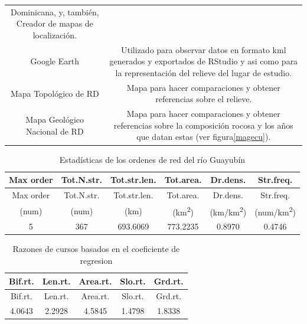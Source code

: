 \documentclass[11pt,]{article}
\begin{document}
\begin{longtable}[]{@{}cc@{}}
\begin{minipage}[t]{0.83\columnwidth}
Dominicana, y, también, Creador de mapas de localización.\strut
\end{minipage}\tabularnewline
\begin{minipage}[t]{0.11\columnwidth}\centering\strut
Google Earth\strut
\end{minipage} & \begin{minipage}[t]{0.83\columnwidth}\centering\strut
Utilizado para observar datos en formato kml generados y exportados de
RStudio y asi como para la representación del relieve del lugar de
estudio.\strut
\end{minipage}\tabularnewline
\begin{minipage}[t]{0.11\columnwidth}\centering\strut
Mapa Topológico de RD\strut
\end{minipage} & \begin{minipage}[t]{0.83\columnwidth}\centering\strut
Mapa para hacer comparaciones y obtener referencias sobre el
relieve.\strut
\end{minipage}\tabularnewline
\begin{minipage}[t]{0.11\columnwidth}\centering\strut
Mapa Geológico Nacional de RD\strut
\end{minipage} & \begin{minipage}[t]{0.83\columnwidth}\centering\strut
Mapa para hacer comparaciones y obtener referencias sobre la composición
rocosa y los años que datan estas (ver figura\ref{magecu}).\strut
\end{minipage}\tabularnewline
\bottomrule
\end{longtable}

\begin{longtable}[]{@{}cccccc@{}}
\caption{\label{tab:estadisticaor} Estadísticas de los ordenes de red
del río Guayubín}\tabularnewline
\toprule
Max order & Tot.N.str. & Tot.str.len. & Tot.area. & Dr.dens. &
Str.freq.\tabularnewline
\midrule
\endfirsthead
\toprule
Max order & Tot.N.str. & Tot.str.len. & Tot.area. & Dr.dens. &
Str.freq.\tabularnewline
\midrule
\endhead
(num) & (num) & (km) & (km\textsuperscript{2}) &
(km/km\textsuperscript{2}) & (num/km\textsuperscript{2})\tabularnewline
5 & 367 & 693.6069 & 773.2235 & 0.8970 & 0.4746\tabularnewline
\bottomrule
\end{longtable}

\begin{longtable}[]{@{}ccccc@{}}
\caption{\label{tab:regresionc} Razones de cursos basados en el
coeficiente de regresion}\tabularnewline
\toprule
Bif.rt. & Len.rt. & Area.rt. & Slo.rt. & Grd.rt.\tabularnewline
\midrule
\endfirsthead
\toprule
Bif.rt. & Len.rt. & Area.rt. & Slo.rt. & Grd.rt.\tabularnewline
\midrule
\endhead
4.0643 & 2.2928 & 4.5845 & 1.4798 & 1.8338\tabularnewline
\bottomrule
\end{longtable}
\end{document}
